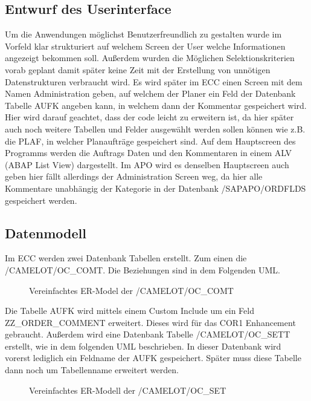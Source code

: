 \subsection{Entwurf des Userinterface}
\label{sec:Benutzeroberflaeche} 
Um die Anwendungen möglichst Benutzerfreundlich zu gestalten wurde im Vorfeld klar strukturiert auf welchem Screen der User welche Informationen angezeigt bekommen soll. Außerdem wurden die Möglichen Selektionskriterien vorab geplant damit später keine Zeit mit der Erstellung von unnötigen Datenstrukturen verbraucht wird. Es wird später im \ac{ECC} einen Screen mit dem Namen Administration geben, auf welchem der Planer ein Feld der Datenbank Tabelle AUFK angeben kann, in welchem dann der Kommentar gespeichert wird. Hier wird darauf geachtet, dass der code leicht zu erweitern ist, da hier später auch noch weitere Tabellen und Felder ausgewählt werden sollen können wie z.B. die PLAF, in welcher Planaufträge gespeichert sind. Auf dem Hauptscreen des Programms werden die Auftrags Daten und den Kommentaren in einem ALV (\ac{ABAP} List View) dargestellt. Im \ac{APO} wird es denselben Hauptscreen auch geben hier fällt allerdings der Administration Screen weg, da hier alle Kommentare unabhängig der Kategorie in der Datenbank /SAPAPO/ORDFLDS gespeichert werden. 

\subsection{Datenmodell}
\label{sec:Datenmodell}
Im ECC werden zwei Datenbank Tabellen erstellt. Zum einen die /CAMELOT/OC\_COMT. Die Beziehungen sind in dem Folgenden \ac{UML}.

\begin{figure}[htb]
\centering
{}
\caption{Vereinfachtes ER-Model der /CAMELOT/OC\_COMT}
\label{fig:ECC01}
\end{figure} 

Die Tabelle AUFK wird mittels einem Custom Include um ein Feld ZZ\_ORDER\_COMMENT erweitert. Dieses wird für das COR1 Enhancement gebraucht. Außerdem wird eine Datenbank Tabelle /CAMELOT/OC\_SETT erstellt, wie in dem folgenden \ac{UML} beschrieben. In dieser Datenbank wird vorerst lediglich ein Feldname der AUFK gespeichert. Später muss diese Tabelle dann noch um Tabellenname erweitert werden.

\begin{figure}[htb]
	\centering
	\caption{Vereinfachtes ER-Modell der /CAMELOT/OC\_SET}
	\label{fig:ECC02}
\end{figure} 


